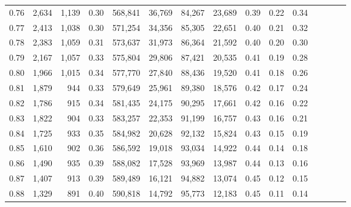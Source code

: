 \begin{tabular}{rrrcrrrrrrrrrrr}
0.76 &   2,634 &  1,139 &                                       0.30 &  568,841 &   36,769 &   84,267 &   23,689 &  0.39 &  0.22 &                         0.34 \\
0.77 &   2,413 &  1,038 &                                       0.30 &  571,254 &   34,356 &   85,305 &   22,651 &  0.40 &  0.21 &                         0.32 \\
0.78 &   2,383 &  1,059 &                                       0.31 &  573,637 &   31,973 &   86,364 &   21,592 &  0.40 &  0.20 &                         0.30 \\
0.79 &   2,167 &  1,057 &                                       0.33 &  575,804 &   29,806 &   87,421 &   20,535 &  0.41 &  0.19 &                         0.28 \\
0.80 &   1,966 &  1,015 &                                       0.34 &  577,770 &   27,840 &   88,436 &   19,520 &  0.41 &  0.18 &                         0.26 \\
0.81 &   1,879 &    944 &                                       0.33 &  579,649 &   25,961 &   89,380 &   18,576 &  0.42 &  0.17 &                         0.24 \\
0.82 &   1,786 &    915 &                                       0.34 &  581,435 &   24,175 &   90,295 &   17,661 &  0.42 &  0.16 &                         0.22 \\
0.83 &   1,822 &    904 &                                       0.33 &  583,257 &   22,353 &   91,199 &   16,757 &  0.43 &  0.16 &                         0.21 \\
0.84 &   1,725 &    933 &                                       0.35 &  584,982 &   20,628 &   92,132 &   15,824 &  0.43 &  0.15 &                         0.19 \\
0.85 &   1,610 &    902 &                                       0.36 &  586,592 &   19,018 &   93,034 &   14,922 &  0.44 &  0.14 &                         0.18 \\
0.86 &   1,490 &    935 &                                       0.39 &  588,082 &   17,528 &   93,969 &   13,987 &  0.44 &  0.13 &                         0.16 \\
0.87 &   1,407 &    913 &                                       0.39 &  589,489 &   16,121 &   94,882 &   13,074 &  0.45 &  0.12 &                         0.15 \\
0.88 &   1,329 &    891 &                                       0.40 &  590,818 &   14,792 &   95,773 &   12,183 &  0.45 &  0.11 &                         0.14 \\

\end{tabular}
